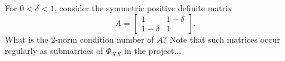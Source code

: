 \documentclass[12pt, leqno]{article}
\begin{document}

For $0 < \delta < 1$, consider the symmetric positive definite matrix
\[
  A = \begin{bmatrix} 1 & 1 - \delta \\ 1 - \delta & 1 \end{bmatrix}.
\]
What is the 2-norm condition number of $A$?  Note that such matrices occur regularly as submatrices of $\Phi_{XX}$ in the project...
\end{document}
